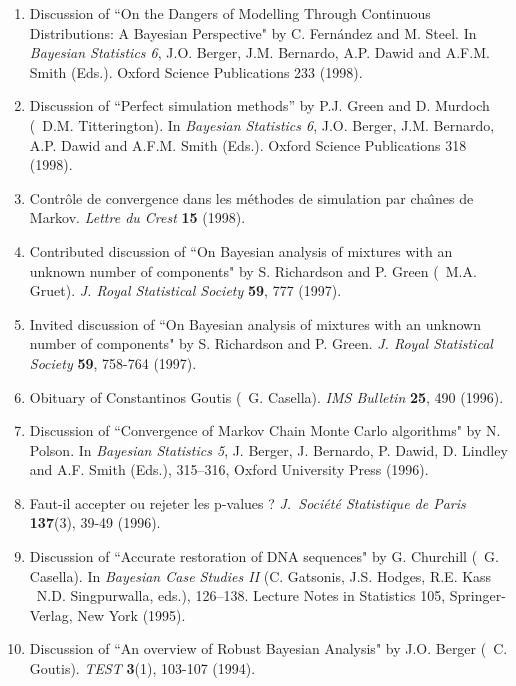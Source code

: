 \begin{enumerate}
\item Discussion of ``On the Dangers of Modelling Through
Continuous Distributions: A Bayesian Perspective" by C. Fern\'andez and M. Steel.
In {\it Bayesian Statistics 6}, J.O. Berger, J.M. Bernardo,
A.P. Dawid and A.F.M. Smith (Eds.). Oxford Science Publications 233 (1998).

\item Discussion of ``Perfect simulation methods'' by P.J. Green and D. Murdoch
(\avec\ D.M. Titterington).  In {\it Bayesian Statistics 6}, 
J.O. Berger, J.M. Bernardo,
A.P. Dawid and A.F.M. Smith (Eds.). Oxford Science Publications 318 (1998).

\item Contr\^ole de convergence dans les m\'ethodes de simulation par 
cha\^\i nes de Markov. {\it Lettre du Crest} {\bf 15} (1998).

\item Contributed discussion of ``On Bayesian analysis of mixtures
with an unknown number of components" by S. Richardson and P. Green 
(\avec\  M.A. Gruet).  {\it J. Royal Statistical Society} {\bf 59}, 
777 (1997).

\item Invited discussion of ``On Bayesian analysis of mixtures
with an unknown number of components" by S. Richardson and P. Green.
{\it J. Royal Statistical Society} {\bf 59}, 758-764 (1997).

\item Obituary of Constantinos Goutis (\avec\  G. Casella).
{\it IMS Bulletin} {\bf 25}, 490 (1996).

\item Discussion of ``Convergence of Markov Chain Monte Carlo algorithms" by N. 
Polson. In {\it Bayesian Statistics 5}, J. Berger, J. Bernardo,
P. Dawid, D. Lindley and A.F. Smith (Eds.), 315--316, 
Oxford University Press (1996).  

\item Faut-il accepter ou rejeter les p-values ? 
{\it J.\ Soci\'et\'e Statistique de Paris} {\bf 137}(3), 39-49 (1996).

\item Discussion of ``Accurate restoration of DNA sequences" by G. Churchill
(\avec\  G. Casella). In
{\it Bayesian Case Studies II} (C. Gatsonis, J.S. Hodges, R.E. Kass \et\  N.D. 
Singpurwalla, eds.), 126--138. Lecture Notes in Statistics 105, Springer-Verlag, 
New York (1995). 

\item Discussion of ``An overview of Robust Bayesian Analysis" by J.O. Berger
(\avec\  C. Goutis). {\it TEST} {\bf 3}(1), 103-107 (1994).


\end{enumerate}
